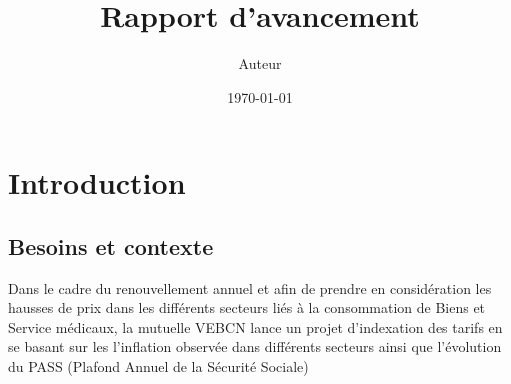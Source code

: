\documentclass[a4paper,12pt]{report}
\author{Auteur}
\title{Rapport d'avancement}
\date{\today}
\begin{document}
\graphicspath{{Figures/}}




\renewcommand\contentsname{Sommaire}
\setcounter{chapter}{1}
\tableofcontents



\newpage

\section{Introduction}
\subsection{Besoins et contexte}
Dans le cadre du renouvellement annuel et afin de prendre en considération les hausses de prix 
dans les différents secteurs liés à la consommation de Biens et Service médicaux, la mutuelle VEBCN
 lance un projet d'indexation des tarifs en se basant sur les l'inflation observée dans différents 
 secteurs ainsi que l'évolution du PASS (Plafond Annuel de la Sécurité Sociale)

\end{document}
